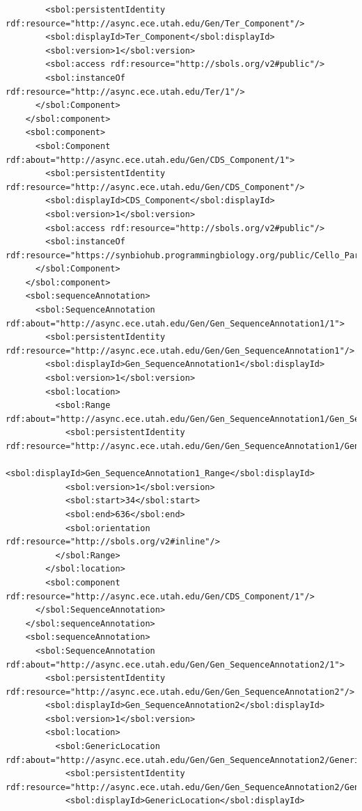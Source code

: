 \begin{lstlisting}
        <sbol:persistentIdentity rdf:resource="http://async.ece.utah.edu/Gen/Ter_Component"/>
        <sbol:displayId>Ter_Component</sbol:displayId>
        <sbol:version>1</sbol:version>
        <sbol:access rdf:resource="http://sbols.org/v2#public"/>
        <sbol:instanceOf rdf:resource="http://async.ece.utah.edu/Ter/1"/>
      </sbol:Component>
    </sbol:component>
    <sbol:component>
      <sbol:Component rdf:about="http://async.ece.utah.edu/Gen/CDS_Component/1">
        <sbol:persistentIdentity rdf:resource="http://async.ece.utah.edu/Gen/CDS_Component"/>
        <sbol:displayId>CDS_Component</sbol:displayId>
        <sbol:version>1</sbol:version>
        <sbol:access rdf:resource="http://sbols.org/v2#public"/>
        <sbol:instanceOf rdf:resource="https://synbiohub.programmingbiology.org/public/Cello_Parts/PhlF/1"/>
      </sbol:Component>
    </sbol:component>
    <sbol:sequenceAnnotation>
      <sbol:SequenceAnnotation rdf:about="http://async.ece.utah.edu/Gen/Gen_SequenceAnnotation1/1">
        <sbol:persistentIdentity rdf:resource="http://async.ece.utah.edu/Gen/Gen_SequenceAnnotation1"/>
        <sbol:displayId>Gen_SequenceAnnotation1</sbol:displayId>
        <sbol:version>1</sbol:version>
        <sbol:location>
          <sbol:Range rdf:about="http://async.ece.utah.edu/Gen/Gen_SequenceAnnotation1/Gen_SequenceAnnotation1_Range/1">
            <sbol:persistentIdentity rdf:resource="http://async.ece.utah.edu/Gen/Gen_SequenceAnnotation1/Gen_SequenceAnnotation1_Range"/>
            <sbol:displayId>Gen_SequenceAnnotation1_Range</sbol:displayId>
            <sbol:version>1</sbol:version>
            <sbol:start>34</sbol:start>
            <sbol:end>636</sbol:end>
            <sbol:orientation rdf:resource="http://sbols.org/v2#inline"/>
          </sbol:Range>
        </sbol:location>
        <sbol:component rdf:resource="http://async.ece.utah.edu/Gen/CDS_Component/1"/>
      </sbol:SequenceAnnotation>
    </sbol:sequenceAnnotation>
    <sbol:sequenceAnnotation>
      <sbol:SequenceAnnotation rdf:about="http://async.ece.utah.edu/Gen/Gen_SequenceAnnotation2/1">
        <sbol:persistentIdentity rdf:resource="http://async.ece.utah.edu/Gen/Gen_SequenceAnnotation2"/>
        <sbol:displayId>Gen_SequenceAnnotation2</sbol:displayId>
        <sbol:version>1</sbol:version>
        <sbol:location>
          <sbol:GenericLocation rdf:about="http://async.ece.utah.edu/Gen/Gen_SequenceAnnotation2/GenericLocation/1">
            <sbol:persistentIdentity rdf:resource="http://async.ece.utah.edu/Gen/Gen_SequenceAnnotation2/GenericLocation"/>
            <sbol:displayId>GenericLocation</sbol:displayId>

\end{lstlisting}
